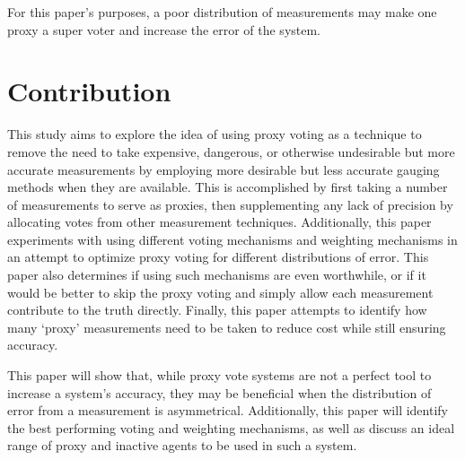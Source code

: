 For this paper's purposes, a poor distribution of measurements may make one
proxy a super voter and increase the error of the system.



\section{Contribution}\label{sec:contribution}
This study aims to explore the idea of using proxy voting as a technique to remove the
need to take expensive, dangerous, or otherwise undesirable but more accurate
measurements by employing more desirable but less accurate gauging methods when they
are available.
This is accomplished by first taking a number of measurements to serve as proxies, then
supplementing any lack of precision by allocating votes from other measurement
techniques.
Additionally, this paper experiments with using different voting mechanisms and
weighting mechanisms in an attempt to optimize proxy voting for different
distributions of error.
This paper also determines if using such mechanisms are even worthwhile, or if it
would be better to skip the proxy voting and simply allow each measurement contribute
to the truth directly.
Finally, this paper attempts to identify how many `proxy' measurements need
to be taken to reduce cost while still ensuring accuracy.

This paper will show that, while proxy vote systems are not a perfect tool to
increase a system's accuracy, they may be beneficial when the distribution of error
from a measurement is asymmetrical.
Additionally, this paper will identify the best performing voting and weighting
mechanisms, as well as discuss an ideal range of proxy and inactive agents to be used
in such a system.


